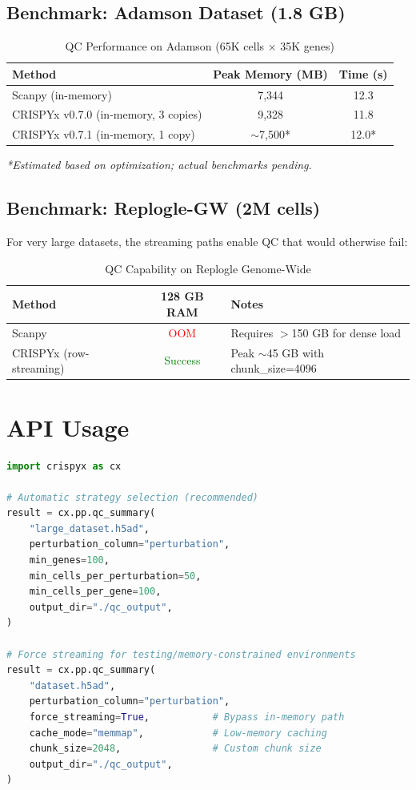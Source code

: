 \documentclass{article}
\begin{document}
\subsection{Benchmark: Adamson Dataset (1.8 GB)}

\begin{table}[h]
\centering
\caption{QC Performance on Adamson (65K cells × 35K genes)}
\begin{tabular}{lcc}
\toprule
\textbf{Method} & \textbf{Peak Memory (MB)} & \textbf{Time (s)} \\
\midrule
Scanpy (in-memory) & 7,344 & 12.3 \\
CRISPYx v0.7.0 (in-memory, 3 copies) & 9,328 & 11.8 \\
CRISPYx v0.7.1 (in-memory, 1 copy) & $\sim$7,500* & 12.0* \\
\bottomrule
\end{tabular}
\label{tab:adamson}
\end{table}
\textit{*Estimated based on optimization; actual benchmarks pending.}

\subsection{Benchmark: Replogle-GW (2M cells)}

For very large datasets, the streaming paths enable QC that would otherwise fail:

\begin{table}[h]
\centering
\caption{QC Capability on Replogle Genome-Wide}
\begin{tabular}{lcl}
\toprule
\textbf{Method} & \textbf{128 GB RAM} & \textbf{Notes} \\
\midrule
Scanpy & \textcolor{red}{OOM} & Requires $>$150 GB for dense load \\
CRISPYx (row-streaming) & \textcolor{green}{Success} & Peak $\sim$45 GB with chunk\_size=4096 \\
\bottomrule
\end{tabular}
\end{table}

\section{API Usage}

\begin{lstlisting}[language=Python]
import crispyx as cx

# Automatic strategy selection (recommended)
result = cx.pp.qc_summary(
    "large_dataset.h5ad",
    perturbation_column="perturbation",
    min_genes=100,
    min_cells_per_perturbation=50,
    min_cells_per_gene=100,
    output_dir="./qc_output",
)

# Force streaming for testing/memory-constrained environments
result = cx.pp.qc_summary(
    "dataset.h5ad",
    perturbation_column="perturbation",
    force_streaming=True,           # Bypass in-memory path
    cache_mode="memmap",            # Low-memory caching
    chunk_size=2048,                # Custom chunk size
    output_dir="./qc_output",
)
\end{lstlisting}
\end{document}
